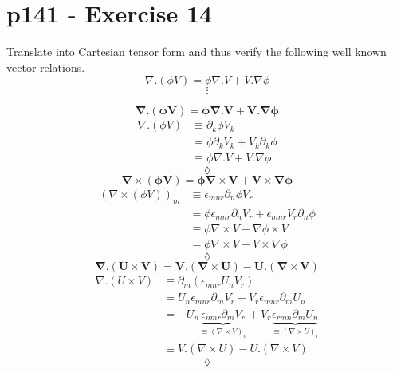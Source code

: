 \section{p141 - Exercise 14}
\begin{tcolorbox}
Translate into Cartesian tensor form and thus verify the following well known vector relations.
$$ \nabla .  \left( \phi V \right) = \phi  \nabla . V + V .\nabla \phi $$
$$ \vdots$$
\end{tcolorbox}
$$ \mathbf{\nabla .  \left( \phi V \right) = \phi  \nabla .V + V .\nabla \phi }$$
\begin{align}
\nabla .  \left( \phi V \right) &\equiv \partial_k \phi V_k\\
&= \phi\partial_k V_k+V_k\partial_k\phi\\
&\equiv \phi\nabla.V+V.\nabla\phi
\end{align}
$$\lozenge$$
$$ \mathbf{\nabla \times  \left( \phi V \right) = \phi  \nabla \times V + V \times \nabla \phi }$$
\begin{align}
\left( \nabla \times  \left( \phi V \right)\right)_m &\equiv \epsilon_{mnr}\partial_n \phi V_r\\
&= \phi\epsilon_{mnr}\partial_n V_r+\epsilon_{mnr}V_r\partial_n\phi\\
&\equiv \phi\nabla\times V+\nabla\phi \times V\\
&= \phi\nabla\times V-  V\times\nabla\phi
\end{align}
$$\lozenge$$
$$ \mathbf{\nabla . \left( U\times V \right) = V .\left( \nabla \times U\right) -  U .\left( \nabla \times V\right)}$$
\begin{align}
\nabla . \left( U\times V \right) &\equiv \partial_m \left(\epsilon_{mnr}U_n V_r\right)\\
&=  U_n\epsilon_{mnr} \partial_m  V_r+ V_r\epsilon_{mnr} \partial_mU_n\\
&=  -U_n\underbrace{\epsilon_{nmr} \partial_m  V_r}_{\equiv \left(\nabla \times V\right)_n}+ V_r\underbrace{\epsilon_{rmn} \partial_m U_n}_{\equiv \left(\nabla \times U\right)_r}\\
&\equiv V .\left( \nabla \times U\right) -  U .\left( \nabla \times V\right)
\end{align}
$$\lozenge$$

